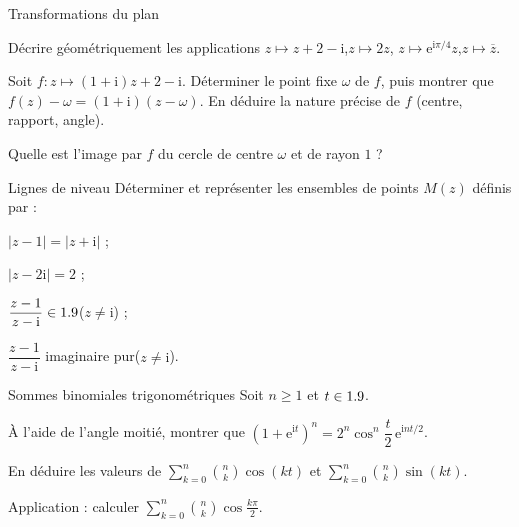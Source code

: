 \begin{exercice}[3]{Transformations du plan}
\begin{questions}
  \item Décrire géométriquement les applications
    $z\mapsto z+2-\mathrm{i}$,\quad $z\mapsto2z$,\quad
    $z\mapsto\mathrm{e}^{\mathrm{i}\pi/4}z$,\quad $z\mapsto\overline{z}$.
  \item Soit $f:z\mapsto(1+\mathrm{i})z+2-\mathrm{i}$. Déterminer le point
    fixe $\omega$ de $f$, puis montrer que
    $f(z)-\omega=(1+\mathrm{i})(z-\omega)$. En déduire la nature précise de
    $f$ (centre, rapport, angle).
  \item Quelle est l'image par $f$ du cercle de centre $\omega$ et de rayon $1$ ?
\end{questions}
\end{exercice}

\begin{exercice}[3]{Lignes de niveau}
Déterminer et représenter les ensembles de points $M(z)$ définis par :
\begin{questions}
  \item $|z-1|=|z+\mathrm{i}|$ ;
  \item $|z-2\mathrm{i}|=2$ ;
  \item $\dfrac{z-1}{z-\mathrm{i}}\in1.9$\quad($z\neq\mathrm{i}$) ;
  \item $\dfrac{z-1}{z-\mathrm{i}}$ imaginaire pur\quad($z\neq\mathrm{i}$).
\end{questions}
\end{exercice}

\begin{exercice}[3]{Sommes binomiales trigonométriques}
Soit $n\geq1$ et $t\in1.9$.
\begin{questions}
  \item À l'aide de l'angle moitié, montrer que
    $(1+\mathrm{e}^{\mathrm{i}t})^{n}=2^{n}\cos^{n}\dfrac{t}{2}\,\mathrm{e}^{\mathrm{i}nt/2}$.
  \item En déduire les valeurs de
    $\displaystyle\sum_{k=0}^{n}\binom{n}{k}\cos(kt)$ et
    $\displaystyle\sum_{k=0}^{n}\binom{n}{k}\sin(kt)$.
  \item Application : calculer $\displaystyle\sum_{k=0}^{n}\binom{n}{k}\cos\frac{k\pi}{2}$.
\end{questions}
\end{exercice}

